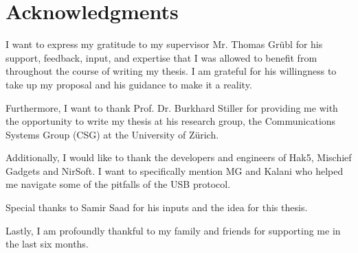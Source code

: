 \chapter*{Acknowledgments}

I want to express my gratitude to my supervisor Mr. Thomas Gr\"ubl for his support, feedback, input, and expertise that I was allowed to benefit from throughout the course of writing my thesis. I am grateful for his willingness to take up my proposal and his guidance to make it a reality.

Furthermore, I want to thank Prof. Dr. Burkhard Stiller for providing me with the opportunity to write my thesis at his research group, the Communications Systems Group (CSG) at the University of Z\"urich.

Additionally, I would like to thank the developers and engineers of Hak5, Mischief Gadgets and NirSoft. I want to specifically mention MG and Kalani who helped me navigate some of the pitfalls of the USB protocol.

Special thanks to Samir Saad for his inputs and the idea for this thesis. 

Lastly, I am profoundly thankful to my family and friends for supporting me in the last six months.




